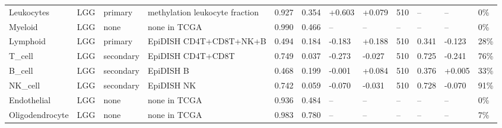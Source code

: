 \begin{table}[htbp]
\begin{tabular}{llllllllllll}
Leukocytes & LGG & primary & methylation leukocyte fraction & 0.927 & 0.354 & +0.603 & +0.079 & 510 & -- & -- & 0\% \\
Myeloid & LGG & none & none in TCGA & 0.990 & 0.466 & -- & -- & -- & -- & -- & 0\% \\
Lymphoid & LGG & primary & EpiDISH CD4T+CD8T+NK+B & 0.494 & 0.184 & -0.183 & +0.188 & 510 & 0.341 & -0.123 & 28\% \\
T\_cell & LGG & secondary & EpiDISH CD4T+CD8T & 0.749 & 0.037 & -0.273 & -0.027 & 510 & 0.725 & -0.241 & 76\% \\
B\_cell & LGG & secondary & EpiDISH B & 0.468 & 0.199 & -0.001 & +0.084 & 510 & 0.376 & +0.005 & 33\% \\
NK\_cell & LGG & secondary & EpiDISH NK & 0.742 & 0.059 & -0.070 & -0.031 & 510 & 0.728 & -0.070 & 91\% \\
Endothelial & LGG & none & none in TCGA & 0.936 & 0.484 & -- & -- & -- & -- & -- & 0\% \\
Oligodendrocyte & LGG & none & none in TCGA & 0.983 & 0.780 & -- & -- & -- & -- & -- & 7\% \\
\bottomrule
\end{tabular}
\end{table}
